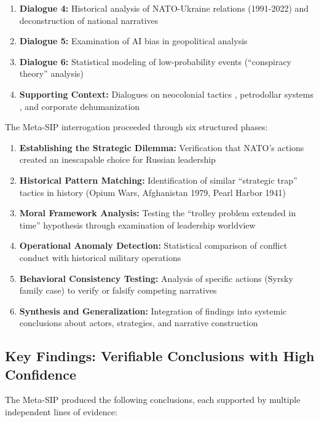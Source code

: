 \documentclass[11pt,a4paper]{article}
\begin{document}
\begin{enumerate}[nosep]
    \item \textbf{Dialogue 4:} Historical analysis of NATO-Ukraine relations (1991-2022) and deconstruction of national narratives \citep{dialogue4}
    \item \textbf{Dialogue 5:} Examination of AI bias in geopolitical analysis \citep{dialogue5}
    \item \textbf{Dialogue 6:} Statistical modeling of low-probability events (``conspiracy theory'' analysis) \citep{dialogue6}
    \item \textbf{Supporting Context:} Dialogues on neocolonial tactics \citep{dialogue3,dialogue7}, petrodollar systems \citep{dialogue2}, and corporate dehumanization \citep{dialogue0}
\end{enumerate}

The Meta-SIP interrogation proceeded through six structured phases:

\begin{enumerate}[leftmargin=*]
    \item \textbf{Establishing the Strategic Dilemma:} Verification that NATO's actions created an inescapable choice for Russian leadership
    \item \textbf{Historical Pattern Matching:} Identification of similar ``strategic trap'' tactics in history (Opium Wars, Afghanistan 1979, Pearl Harbor 1941)
    \item \textbf{Moral Framework Analysis:} Testing the ``trolley problem extended in time'' hypothesis through examination of leadership worldview
    \item \textbf{Operational Anomaly Detection:} Statistical comparison of conflict conduct with historical military operations
    \item \textbf{Behavioral Consistency Testing:} Analysis of specific actions (Syrsky family case) to verify or falsify competing narratives
    \item \textbf{Synthesis and Generalization:} Integration of findings into systemic conclusions about actors, strategies, and narrative construction
\end{enumerate}

\subsection{Key Findings: Verifiable Conclusions with High Confidence}

The Meta-SIP produced the following conclusions, each supported by multiple independent lines of evidence:
\end{document}
